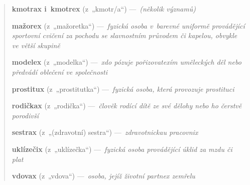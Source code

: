 \newenvironment{slovnik}{%
    \newcommand*{\slovo}[3]{\noindent\textbf{##2} ({\footnotesize z~„##1“}) {---~\itshape{}##3}\par}%
    \begin{quote}
    }{%
    \par\end{quote}%
}

\begin{slovnik}%
\slovo{kmotr/a}{kmotrax {\mdseries i} kmotrex}{(několik významů)}%
\slovo{mažoretka}{mažorex}{fyzická osoba v barevné uniformě provádějící sportovní cvičení za pochodu se slavnostním průvodem či kapelou, obvykle ve větší skupině}%
\slovo{modelka}{modelex}{xdo pózuje pořizovatexím uměleckých děl nebo předvádí oblečení ve společnosti}%
\slovo{prostitutka}{prostitux}{fyzická osoba, která provozuje prostituci}%
\slovo{rodička}{rodičkax}{člověk rodící dítě ze své dělohy nebo ho čerstvě porodivší}%
\slovo{(zdravotní) sestra}{sestrax}{zdravotnickau pracovnix}%
\slovo{uklízečka}{uklízečix}{fyzická osoba provádějící úklid za mzdu či plat}%
\slovo{vdova}{vdovax}{osoba, jejíž životní partnex zemřelu}%
\end{slovnik}
